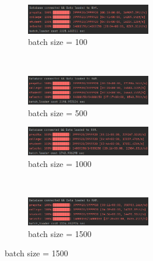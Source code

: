 \begin{figure}[!h]
	\centering
	\begin{subfigure}[b]{0.8\textwidth}
		\centerline{\includegraphics[width=0.6\textwidth]{./sp/batch100.png}}
		\caption{batch size = 100}
	\end{subfigure}\\
	\begin{subfigure}[b]{0.8\textwidth}
		\centerline{\includegraphics[width=0.6\textwidth]{./sp/batch500.png}}
		\caption{batch size = 500}
	\end{subfigure}	
	\begin{subfigure}[b]{0.8\textwidth}
		\centerline{\includegraphics[width=0.6\textwidth]{./sp/batch1000.png}}
		\caption{batch size = 1000}
	\end{subfigure}\\
	\begin{subfigure}[b]{0.8\textwidth}
		\centerline{\includegraphics[width=0.6\textwidth]{./sp/batch1500.png}}
		\caption{batch size = 1500}
	\end{subfigure}	
	\label{fig:visual_smap}
\end{figure}

